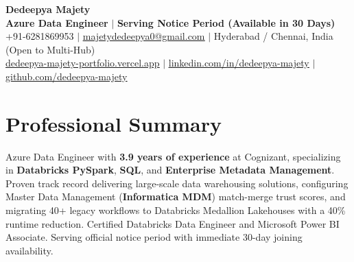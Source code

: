 \documentclass[letterpaper,10pt]{article}
\begin{document}
\begin{center}
    {\Huge \bfseries \color{primaryAccent} Dedeepya Majety} \\ \vspace{2pt}
    \textbf{Azure Data Engineer} $\vert$ \textbf{Serving Notice Period (Available in 30 Days)} \\ \vspace{2pt}
    \small +91-6281869953 $\vert$ \href{mailto:majetydedeepya0@gmail.com}{\underline{majetydedeepya0@gmail.com}} $\vert$ Hyderabad / Chennai, India (Open to Multi-Hub) \\ \vspace{1.5pt}
    \href{https://dedeepya-majety-portfolio.vercel.app}{\underline{dedeepya-majety-portfolio.vercel.app}} $\vert$ \href{https://linkedin.com/in/dedeepya-majety}{\underline{linkedin.com/in/dedeepya-majety}} $\vert$ \href{https://github.com/dedeepya-majety}{\underline{github.com/dedeepya-majety}}
\end{center}
\vspace{-8pt}

\section{Professional Summary}
\small{
Azure Data Engineer with \textbf{3.9 years of experience} at Cognizant, specializing in \textbf{Databricks PySpark}, \textbf{SQL}, and \textbf{Enterprise Metadata Management}. Proven track record delivering large-scale data warehousing solutions, configuring Master Data Management (\textbf{Informatica MDM}) match-merge trust scores, and migrating 40+ legacy workflows to Databricks Medallion Lakehouses with a 40\% runtime reduction. Certified Databricks Data Engineer and Microsoft Power BI Associate. Serving official notice period with immediate 30-day joining availability.
}
\vspace{-2pt}

\end{document}
